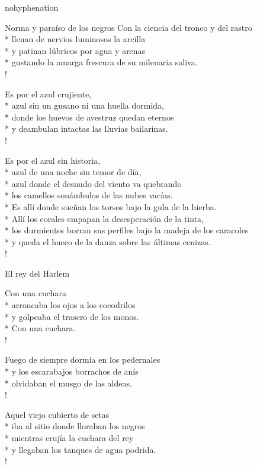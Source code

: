 \documentclass[
    a5paper,
    DIV=10,
    12pt,
    notitlepage,
    oneside,]
{scrbook} %
\begin{document}
\begin{hyphenrules}{nohyphenation}
\begin{poem}{Norma y paraíso de los negros}{}{\vspace{-1em}}
Con la ciencia del tronco y del rastro\\*
llenan de nervios luminosos la arcilla\\*
y patinan lúbricos por agua y arenas\\*
gustando la amarga frescura de su milenaria saliva.\\!

Es por el azul crujiente,\\*
azul sin un gusano ni una huella dormida,\\*
donde los huevos de avestruz quedan eternos\\*
y deambulan intactas las lluvias bailarinas.\\!

Es por el azul sin historia,\\*
azul de una noche sin temor de día,\\*
azul donde el desnudo del viento va quebrando\\*
los camellos sonámbulos de las nubes vacías.\\*
Es allí donde sueñan los torsos bajo la gula de la hierba.\\*
Allí los corales empapan la desesperación de la tinta,\\*
los durmientes borran sus perfiles bajo la madeja de los caracoles\\*
y queda el hueco de la danza sobre las últimas cenizas.\\!

\end{poem}

\begin{poem}{El rey del Harlem}{}{\vspace{-1em}}

Con una cuchara\\*
arrancaba los ojos a los cocodrilos\\*
y golpeaba el trasero de los monos.\\*
Con una cuchara.\\!

Fuego de siempre dormía en los pedernales\\*
y los escarabajos borrachos de anís\\*
olvidaban el musgo de las aldeas.\\!

Aquel viejo cubierto de setas\\*
iba al sitio donde lloraban los negros\\*
mientras crujía la cuchara del rey\\*
y llegaban los tanques de agua podrida.\\!


\end{poem}
\end{hyphenrules}
\end{document}
